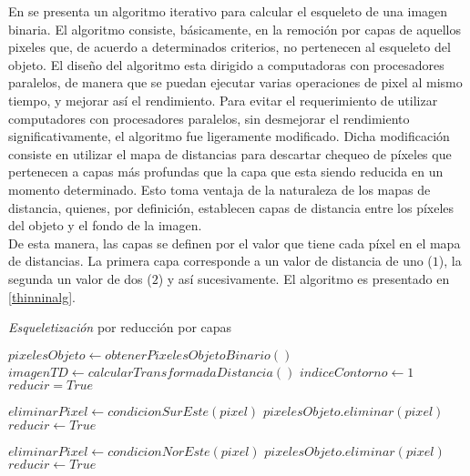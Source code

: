 En \cite{thinning} se presenta un algoritmo iterativo para calcular el esqueleto de
una imagen binaria. El algoritmo consiste, b\'asicamente, en la remoci\'on por capas
de aquellos pixeles que, de acuerdo a determinados criterios, no pertenecen al esqueleto
del objeto. El dise\~no del algoritmo esta dirigido a computadoras con procesadores 
paralelos, de manera que se puedan ejecutar varias operaciones de pixel al mismo tiempo,
y mejorar as\'i el rendimiento. Para evitar el requerimiento de utilizar computadores
con procesadores paralelos, sin desmejorar el rendimiento significativamente,
el algoritmo fue ligeramente modificado. Dicha modificaci\'on consiste en utilizar
el mapa de distancias para descartar chequeo de p\'ixeles que pertenecen a capas
m\'as profundas que la capa que esta siendo reducida en un momento determinado.
Esto toma ventaja de la naturaleza de los mapas de distancia, quienes, por definici\'on,
establecen capas de distancia entre los p\'ixeles del objeto y el fondo de la imagen.\\
De esta manera, las capas se definen por el valor que tiene cada p\'ixel en el mapa 
de distancias. La primera capa corresponde a un valor de distancia de uno ($1$), la segunda
un valor de dos ($2$) y as\'i sucesivamente. El algoritmo es presentado en \ref{thinninalg}.

\begin{algorithm}                     
\caption{\emph{Esqueletizaci\'on} por reducci\'on por capas}         
\label{thinninalg}                    
\begin{algorithmic}                   
\STATE $pixelesObjeto \leftarrow obtenerPixelesObjetoBinario()$
\STATE $imagenTD \leftarrow calcularTransformadaDistancia()$
\STATE $indiceContorno \leftarrow 1$
\STATE $reducir = True$


\STATE {}
\STATE {}
\ELSE
\STATE $eliminarPixel \leftarrow condicionSurEste(pixel)$
\STATE $pixelesObjeto.eliminar(pixel)$
\STATE $reducir \leftarrow True$
\ENDIF

\ENDIF
\ENDFOR


\STATE {}
\STATE {}
\ELSE
\STATE $eliminarPixel \leftarrow condicionNorEste(pixel)$
\STATE $pixelesObjeto.eliminar(pixel)$
\STATE $reducir \leftarrow True$
\ENDIF
\ENDIF
\ENDFOR
\ENDWHILE
\STATE 
{}

\end{algorithmic}
\end{algorithm}

